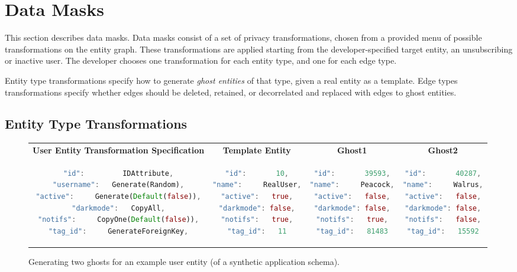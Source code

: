 \section{Data Masks}
\label{sec:policies}

This section describes data masks. Data masks consist of a set of privacy transformations, chosen
from a provided menu of possible transformations on the entity graph. These transformations are
applied starting from the developer-specified target entity, \eg an unsubscribing or inactive user.
The developer chooses one transformation for each entity type, and one for each edge type.

Entity type transformations specify how to generate \emph{ghost entities} of that type, given a real
entity as a  template.  Edge types transformations specify whether edges should be deleted,
retained, or decorrelated and replaced with edges to ghost entities.

\subsection{Entity Type Transformations}
\label{sec:ghosting}

\begin{figure}[t!]
    \centering
    \footnotesize
\begin{tabular}{@{}c|c|c|c@{}}
\textbf{User Entity Transformation Specification} & \textbf{Template Entity} & \textbf{Ghost1} &
    \textbf{Ghost2} \\
\begin{lstlisting}[language=Rust]
"id":         IDAttribute,
"username":   Generate(Random),
"active":     Generate(Default(false)),
"darkmode":   CopyAll,
"notifs":     CopyOne(Default(false)),
"tag_id":     GenerateForeignKey,
\end{lstlisting}
    & 
\begin{lstlisting}[language=Rust]
"id":       10,
"name":     RealUser,
"active":   true,
"darkmode": false,
"notifs":   true,
"tag_id":   11
\end{lstlisting}
& 
\begin{lstlisting}[language=Rust]
"id":       39593,
"name":     Peacock,
"active":   false,
"darkmode": false,
"notifs":   true,
"tag_id":   81483
\end{lstlisting}
&
\begin{lstlisting}[language=Rust]
"id":       40287,
"name":     Walrus,
"active":   false,
"darkmode": false,
"notifs":   false,
"tag_id":   15592
\end{lstlisting}
\end{tabular}
    \caption{Generating two ghosts for an example user entity (of a synthetic application schema).} 
    \label{fig:ghosting}
\end{figure}

